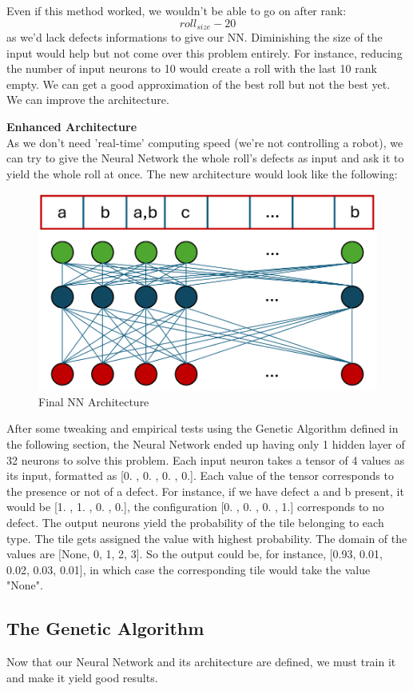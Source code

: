\documentclass{modeleRapport}
\begin{document}
Even if this method worked, we wouldn't be able to go on after rank: \[roll_{size} - 20 \] as we'd lack defects informations 
to give our NN. Diminishing the size of the input would help but not come over this problem entirely. For instance,
reducing the number of input neurons to 10 would create a roll with the last 10 rank empty. We can get a good approximation
of the best roll but not the best yet. We can improve the architecture.

\textbf{Enhanced Architecture}\\

As we don't need 'real-time' computing speed (we're not controlling a robot), we can try to give the Neural Network the whole
roll's defects as input and ask it to yield the whole roll at once. The new architecture would look like the following:\\

\begin{figure}[H]
    \centering
    \includegraphics[width=12cm]{Images/NN_V2.png}
    \caption{Final NN Architecture}
\end{figure}

After some tweaking and empirical tests using the Genetic Algorithm defined in the following section, the Neural Network
ended up having only 1 hidden layer of 32 neurons to solve this problem. Each input neuron takes a tensor of 4 values as 
its input, formatted as [0. , 0. , 0. , 0.]. Each value of the tensor corresponds to the presence or not of a defect. For
instance, if we have defect a and b present, it would be [1. , 1. , 0. , 0.], the configuration [0. , 0. , 0. , 1.]
corresponds to no defect. The output neurons yield the probability of the tile belonging to each type. The tile gets 
assigned the value with highest probability. The domain of the values are [None, 0, 1, 2, 3]. So the output could be, for
instance, [0.93, 0.01, 0.02, 0.03, 0.01], in which case the corresponding tile would take the value "None".


\subsection{The Genetic Algorithm}

Now that our Neural Network and its architecture are defined, we must train it and make it yield good results. 
\end{document}

